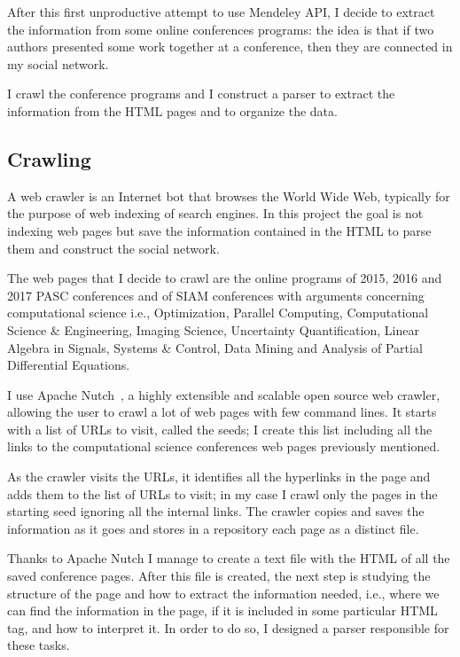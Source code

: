 \documentclass[]{usiinfbachelorproject}
\begin{document}
After this first unproductive attempt to use Mendeley API, I decide to  extract the information from some online conferences programs: the idea is that if two authors presented some work together at a conference, then they are connected in my social network.

I crawl the conference programs and I construct a parser to extract the information from the HTML pages and to organize the data.

\subsection{Crawling}

A web crawler is an Internet bot that browses the World Wide Web, typically for the purpose of web indexing of search engines. In this project the goal is not indexing web pages but save the information contained in the HTML to parse them and construct the social network.

The web pages that I decide to crawl are the online programs of 2015, 2016 and 2017 PASC conferences and of SIAM conferences with arguments concerning computational science i.e., Optimization, Parallel Computing, Computational Science \& Engineering, Imaging Science, Uncertainty Quantification, Linear Algebra in Signals, Systems \& Control, Data Mining and Analysis of Partial Differential Equations.

I use Apache Nutch~\cite{nutch}, a highly extensible and scalable open source web crawler, allowing the user to crawl a lot of web pages with few command lines.
It starts with a list of URLs to visit, called the seeds; I create this list including all the links to the computational science conferences web pages previously mentioned.

As the crawler visits the URLs, it identifies all the hyperlinks in the page and adds them to the list of URLs to visit; in my case I crawl only the pages in the starting seed ignoring all the internal links. The crawler copies and saves the information as it goes and stores in a repository each page as a distinct file.

Thanks to Apache Nutch I manage to create a text file with the HTML of all the saved conference pages. After this file is created, the next step is studying the structure of the page and how to extract the information needed, i.e., where we can find the information in the page, if it is included in some particular HTML tag, and how to interpret it. In order to do so, I designed a parser responsible for these tasks.
\end{document}
